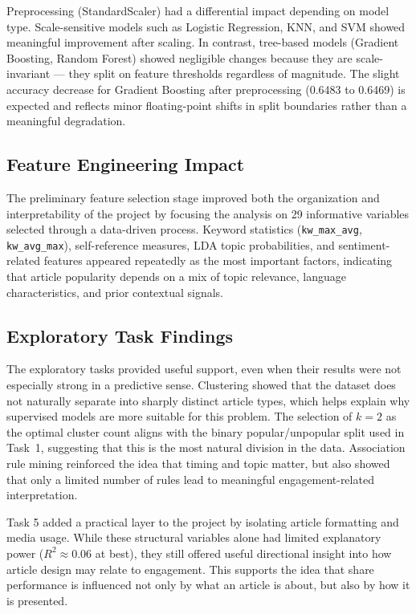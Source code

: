 Preprocessing (StandardScaler) had a differential impact depending on model type. Scale-sensitive models such as Logistic Regression, KNN, and SVM showed meaningful improvement after scaling. In contrast, tree-based models (Gradient Boosting, Random Forest) showed negligible changes because they are scale-invariant --- they split on feature thresholds regardless of magnitude. The slight accuracy decrease for Gradient Boosting after preprocessing (0.6483 to 0.6469) is expected and reflects minor floating-point shifts in split boundaries rather than a meaningful degradation.

\subsection{Feature Engineering Impact}

The preliminary feature selection stage improved both the organization and interpretability of the project by focusing the analysis on 29 informative variables selected through a data-driven process. Keyword statistics (\texttt{kw\_max\_avg}, \texttt{kw\_avg\_max}), self-reference measures, LDA topic probabilities, and sentiment-related features appeared repeatedly as the most important factors, indicating that article popularity depends on a mix of topic relevance, language characteristics, and prior contextual signals.

\subsection{Exploratory Task Findings}

The exploratory tasks provided useful support, even when their results were not especially strong in a predictive sense. Clustering showed that the dataset does not naturally separate into sharply distinct article types, which helps explain why supervised models are more suitable for this problem. The selection of $k=2$ as the optimal cluster count aligns with the binary popular/unpopular split used in Task~1, suggesting that this is the most natural division in the data. Association rule mining reinforced the idea that timing and topic matter, but also showed that only a limited number of rules lead to meaningful engagement-related interpretation.

Task 5 added a practical layer to the project by isolating article formatting and media usage. While these structural variables alone had limited explanatory power ($R^2 \approx 0.06$ at best), they still offered useful directional insight into how article design may relate to engagement. This supports the idea that share performance is influenced not only by what an article is about, but also by how it is presented.

